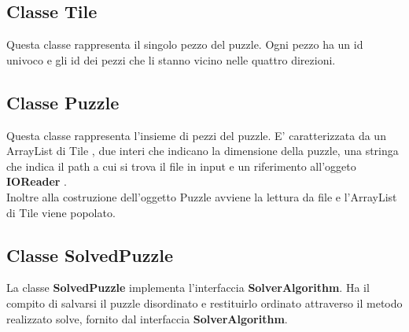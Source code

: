 \documentclass[11pt]{article}
\begin{document}
\subsection{Classe Tile}
Questa classe rappresenta il singolo pezzo del puzzle. Ogni pezzo ha un id univoco e gli id dei pezzi che li stanno vicino nelle quattro direzioni. 
\subsection{Classe Puzzle}
Questa classe rappresenta l'insieme di pezzi del puzzle. E' caratterizzata da un ArrayList di Tile , due interi che indicano la dimensione della puzzle, una stringa che indica il path a cui si trova il file in input e un riferimento all'oggeto \textbf{IOReader }.\\
Inoltre alla costruzione dell'oggetto Puzzle avviene la lettura da file e l'ArrayList di Tile viene popolato.
\subsection{Classe SolvedPuzzle}
La classe \textbf{SolvedPuzzle} implementa l'interfaccia \textbf{SolverAlgorithm}. Ha il compito di salvarsi il puzzle disordinato e restituirlo ordinato attraverso il metodo realizzato solve, fornito dal interfaccia \textbf{SolverAlgorithm}. 
\end{document}
